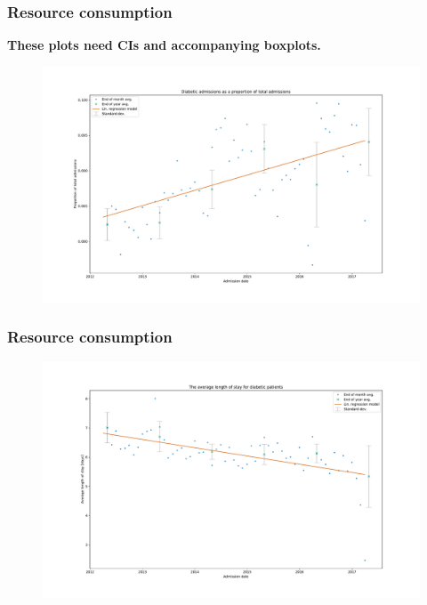 \documentclass{beamer}
\begin{document}
\begin{frame}
    \frametitle{Resource consumption}
    \textbf{These plots need CIs and accompanying boxplots.}
    \begin{figure}
    \includegraphics[width=\linewidth]{./img/diabetic_admissions.pdf}
    \end{figure}
\end{frame}

\begin{frame}
    \frametitle{Resource consumption}

    \begin{figure}
    \includegraphics[width=\linewidth]{./img/diabetic_LOS_time.pdf}
    \end{figure}
\end{frame}
\end{document}
